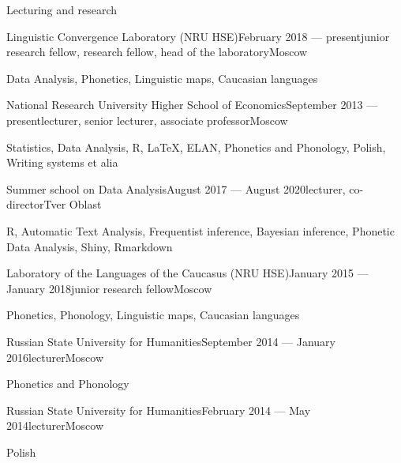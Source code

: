 \documentclass{resume} %
\begin{document}
\begin{rSection}{Lecturing and research}
\begin{rSubsection}{Linguistic Convergence Laboratory (NRU HSE)}{February 2018 --- present}{junior research fellow, research fellow, head of the laboratory}{Moscow}
\item Data Analysis, Phonetics, Linguistic maps, Caucasian languages
\end{rSubsection}
\begin{rSubsection}{National Research University Higher School of Economics}{September 2013 --- present}{lecturer, senior lecturer, associate professor}{Moscow}
\item Statistics, Data Analysis, R, \LaTeX, ELAN, Phonetics and Phonology, Polish, Writing systems et alia
\end{rSubsection}
\begin{rSubsection}{Summer school on Data Analysis}{August 2017 --- August 2020}{lecturer, co-director}{Tver Oblast}
\item R, Automatic Text Analysis, Frequentist inference, Bayesian inference, Phonetic Data Analysis, Shiny, Rmarkdown
\end{rSubsection}
\begin{rSubsection}{Laboratory of the Languages of the Caucasus (NRU HSE)}{January 2015 --- January 2018}{junior research fellow}{Moscow}
\item Phonetics, Phonology, Linguistic maps, Caucasian languages
\end{rSubsection}
\begin{rSubsection}{Russian State University for Humanities}{September 2014 --- January 2016}{lecturer}{Moscow}
\item Phonetics and Phonology
\end{rSubsection}
\begin{rSubsection}{Russian State University for Humanities}{February 2014 --- May 2014}{lecturer}{Moscow}
\item Polish
\end{rSubsection}

\end{rSection}
\end{document}
